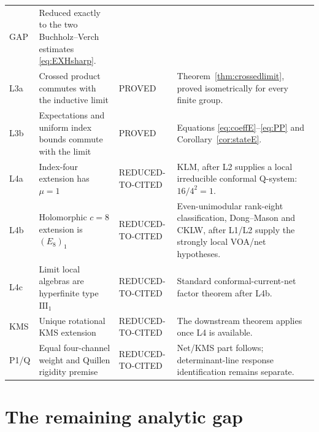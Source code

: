 \documentclass[11pt]{article}
\theoremstyle{remark}
\newcommand{\mP}{\textsf{PROVED}}
\newcommand{\mR}{\textsf{REDUCED-TO-CITED}}
\newcommand{\mG}{\textsf{GAP}}
\begin{document}
\begin{longtable}{@{}p{}p{}p{}p{}@{}}
\mG &
Reduced exactly to the two Buchholz--Verch estimates
\eqref{eq:EXHsharp}.\\
L3a & Crossed product commutes with the inductive limit &
\mP &
Theorem~\ref{thm:crossedlimit}, proved isometrically for every finite
group.\\
L3b & Expectations and uniform index bounds commute with the limit &
\mP &
Equations \eqref{eq:coeffE}--\eqref{eq:PP} and
Corollary~\ref{cor:stateE}.\\
L4a & Index-four extension has $\mu=1$ &
\mR &
KLM, after L2 supplies a local irreducible conformal Q-system:
$16/4^2=1$.\\
L4b & Holomorphic $c=8$ extension is $(E_8)_1$ &
\mR &
Even-unimodular rank-eight classification, Dong--Mason and CKLW,
after L1/L2 supply the strongly local VOA/net hypotheses.\\
L4c & Limit local algebras are hyperfinite type $\mathrm{III}_1$ &
\mR &
Standard conformal-current-net factor theorem after L4b.\\
KMS & Unique rotational KMS extension &
\mR &
The downstream theorem applies once L4 is available.\\
P1/Q & Equal four-channel weight and Quillen rigidity premise &
\mR &
Net/KMS part follows; determinant-line response identification remains
separate.\\
\bottomrule
\end{longtable}

\section{The remaining analytic gap}
\end{document}
